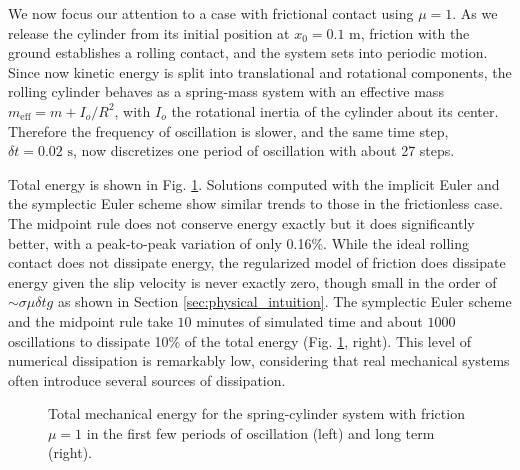 We now focus our attention to a case with frictional contact using $\mu=1$. As
we release the cylinder from its initial position at $x_0=0.1\text{ m}$,
friction with the ground establishes a rolling contact, and the system sets into
periodic motion. Since now kinetic energy is split into translational and
rotational components, the rolling cylinder behaves as a spring-mass system with
an effective mass $m_\text{eff}=m+I_o/R^2$, with $I_o$ the rotational inertia of
the cylinder about its center. Therefore the frequency of oscillation is slower,
and the same time step, $\delta t=0.02\text{ s}$, now discretizes one period of
oscillation with about 27 steps.

Total energy is shown in Fig. \ref{fig:spring_cylinder_energy}. Solutions
computed with the implicit Euler and the symplectic Euler scheme show similar
trends to those in the frictionless case. The midpoint rule does not conserve
energy exactly but it does significantly better, with a peak-to-peak variation
of only 0.16\%. While the ideal rolling contact does not dissipate energy, the
regularized model of friction does dissipate energy given the slip velocity is
never exactly zero, though small in the order of $\sim\sigma\mu\delta t g$ as
shown in Section \ref{sec:physical_intuition}. The symplectic Euler scheme and
the midpoint rule take $10$ minutes of simulated time and about $1000$
oscillations to dissipate 10\% of the total energy (Fig.
\ref{fig:spring_cylinder_energy}, right). This level of numerical dissipation is
remarkably low, considering that real mechanical systems often introduce several
sources of dissipation.
\begin{figure}[!h]
    \centering
    \caption{\label{fig:spring_cylinder_energy} 
    Total mechanical energy for the spring-cylinder system with friction $\mu=1$
    in the first few periods of oscillation (left) and long term (right).}
\end{figure}

